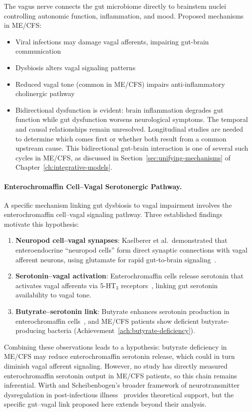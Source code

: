 The vagus nerve connects the gut microbiome directly to brainstem nuclei controlling autonomic function, inflammation, and mood. Proposed mechanisms in ME/CFS:
\begin{itemize}
    \item Viral infections may damage vagal afferents, impairing gut-brain communication
    \item Dysbiosis alters vagal signaling patterns
    \item Reduced vagal tone (common in ME/CFS) impairs anti-inflammatory cholinergic pathway
    \item Bidirectional dysfunction is evident: brain inflammation degrades gut function while gut dysfunction worsens neurological symptoms. The temporal and causal relationships remain unresolved. Longitudinal studies are needed to determine which comes first or whether both result from a common upstream cause. This bidirectional gut-brain interaction is one of several such cycles in ME/CFS, as discussed in Section~\ref{sec:unifying-mechanisms} of Chapter~\ref{ch:integrative-models}.
\end{itemize}

\paragraph{Enterochromaffin Cell--Vagal Serotonergic Pathway.}

A specific mechanism linking gut dysbiosis to vagal impairment involves the enterochromaffin cell--vagal signaling pathway. Three established findings motivate this hypothesis:
\begin{enumerate}
    \item \textbf{Neuropod cell--vagal synapses}: Kaelberer et al.\ demonstrated that enteroendocrine ``neuropod cells'' form direct synaptic connections with vagal afferent neurons, using glutamate for rapid gut-to-brain signaling~\cite{Kaelberer2018}.
    \item \textbf{Serotonin--vagal activation}: Enterochromaffin cells release serotonin that activates vagal afferents via 5-HT$_3$ receptors~\cite{Barton2023,Barton2025}, linking gut serotonin availability to vagal tone.
    \item \textbf{Butyrate--serotonin link}: Butyrate enhances serotonin production in enterochromaffin cells~\cite{Barton2025}, and ME/CFS patients show deficient butyrate-producing bacteria (Achievement~\ref{ach:butyrate-deficiency}).
\end{enumerate}
Combining these observations leads to a hypothesis: butyrate deficiency in ME/CFS may reduce enterochromaffin serotonin release, which could in turn diminish vagal afferent signaling. However, no study has directly measured enterochromaffin serotonin output in ME/CFS patients, so this chain remains inferential. Wirth and Scheibenbogen's broader framework of neurotransmitter dysregulation in post-infectious illness~\cite{WirthScheibenbogen2025Neurotransmitter} provides theoretical support, but the specific gut--vagal link proposed here extends beyond their analysis.

